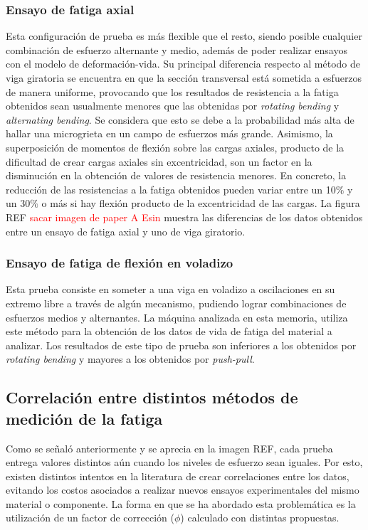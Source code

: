 \subsubsection{Ensayo de fatiga axial}
Esta configuración de prueba es más flexible que el resto, siendo posible cualquier combinación de esfuerzo alternante y medio, además de poder realizar ensayos con el modelo de deformación-vida. Su principal diferencia respecto al método de viga giratoria se encuentra en que la sección transversal está sometida a esfuerzos de manera uniforme, provocando que los resultados de resistencia a la fatiga obtenidos sean usualmente menores que las obtenidas por \textit{rotating bending} y \textit{alternating bending}. Se considera que esto se debe a la  probabilidad más alta de hallar una microgrieta en un campo de esfuerzos más grande. Asimismo, la superposición de momentos de flexión sobre las cargas axiales, producto de la dificultad de crear cargas axiales sin excentricidad, son un factor en la disminución en la obtención de valores de resistencia menores. En concreto, la reducción de las resistencias a la fatiga obtenidos pueden variar entre un 10$\%$ y un 30$\%$ o más si hay flexión producto de la excentricidad de las cargas. La figura REF \textcolor{red}{sacar imagen de paper A Esin} muestra las diferencias de los datos obtenidos entre un ensayo de fatiga axial y uno de viga giratorio.

\subsubsection{Ensayo de fatiga de flexión en voladizo}
Esta prueba consiste en someter a una viga en voladizo a oscilaciones en su extremo libre a través de algún mecanismo, pudiendo lograr combinaciones de esfuerzos medios y alternantes. La máquina analizada en esta memoria, utiliza este método para la obtención de los datos de vida de fatiga del material a analizar. Los resultados de este tipo de prueba son inferiores a los obtenidos por \textit{rotating bending} y mayores a los obtenidos por \textit{push-pull}.

\subsection{Correlación entre distintos métodos de medición de la fatiga}
Como se señaló anteriormente y se aprecia en la imagen REF, cada prueba entrega valores distintos aún cuando los niveles de esfuerzo sean iguales. Por esto, existen distintos intentos en la literatura de crear correlaciones entre los datos, evitando los costos asociados a realizar nuevos ensayos experimentales del mismo material o componente. La forma en que se ha abordado esta problemática es la utilización de un factor de corrección ($\phi$) calculado con distintas propuestas.

